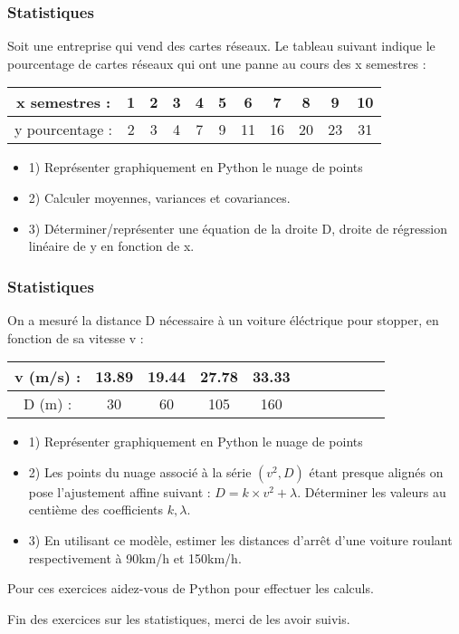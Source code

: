 \documentclass{beamer}
\begin{document}
\begin{frame} %
  \frametitle{Statistiques}
  \begin{exercice}[3]
Soit une entreprise qui vend des cartes réseaux. Le tableau suivant indique le pourcentage de cartes réseaux qui ont une panne au cours des x semestres : 

  \begin{tabular}{|c|c|c|c|c|c|c|c|c|c|c|}
    \hline
    x semestres : & 1 & 2 & 3 & 4 & 5 & 6 & 7 & 8 & 9 & 10 \\
    \hline
    y pourcentage : & 2 & 3 & 4 & 7 & 9 & 11 & 16 & 20 & 23 & 31 \\
    \hline
 \end{tabular}
 \begin{itemize}
   \item 1) Représenter graphiquement en Python le nuage de points
   \item 2) Calculer moyennes, variances et covariances.
   \item 3) Déterminer/représenter une équation de la droite D, droite de régression linéaire de y en fonction de x.
 \end{itemize}
\end{exercice}
\end{frame}

\begin{frame} %
  \frametitle{Statistiques}
  \begin{exercice}[4]
On a mesuré la distance D nécessaire à un voiture éléctrique pour stopper, en fonction de sa vitesse v :
  \begin{tabular}{|c|c|c|c|c|c|c|c|c|c|c|}
    \hline
    v (m/s) : & 13.89 & 19.44 & 27.78 & 33.33  \\
    \hline
    D (m) : & 30 & 60 & 105 & 160  \\
    \hline
 \end{tabular}
 \begin{itemize}
   \item 1) Représenter graphiquement en Python le nuage de points
   \item 2) Les points du nuage associé à la série $(v^2, D)$ étant presque alignés on pose l'ajustement affine suivant : $ D = k \times v^2 + \lambda$. Déterminer les valeurs au centième des coefficients $k, \lambda$.
   \item 3) En utilisant ce modèle, estimer les distances d'arrêt d'une voiture roulant respectivement à 90km/h et 150km/h.
 \end{itemize}
 Pour ces exercices aidez-vous de Python pour effectuer les calculs.
\end{exercice}
\end{frame}

\begin{frame} %
 Fin des exercices sur les statistiques, merci de les avoir suivis.
\end{frame}
  
\end{document}
